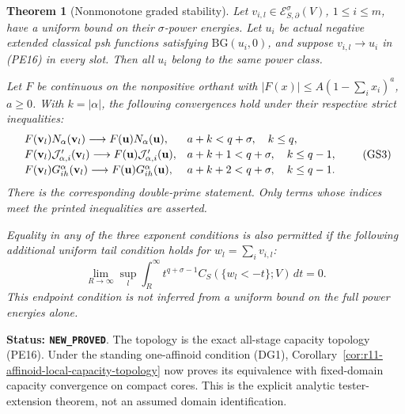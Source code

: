 \documentclass[11pt,a4paper]{article}
\numberwithin{equation}{section}
\newtheorem{theorem}{Theorem}[section]
\theoremstyle{definition}
\theoremstyle{remark}
\begin{document}
\begin{theorem}[Nonmonotone graded stability]
\label{thm:r11-nonmonotone-graded-stability}
Let $v_{i,l}\in\mathcal E^\sigma_{S,\partial}(V)$,
$1\leq i\leq m$, have a uniform bound on their
$\sigma$-power energies. Let $u_i$ be actual negative
extended classical psh functions satisfying
$\mathrm{BG}(u_i,0)$, and suppose
$v_{i,l}\to u_i$ in (PE16) in every slot.
Then all $u_i$ belong to the same power class.

Let $F$ be continuous on the nonpositive orthant with
$|F(x)|\leq A(1-\sum_i x_i)^a$, $a\geq0$.
With $k=|\alpha|$, the following convergences hold
under their respective strict inequalities:
\[
\begin{array}{ll}
 F(\mathbf v_l)N_\alpha(\mathbf v_l)
       \longrightarrow F(\mathbf u)N_\alpha(\mathbf u),
       &a+k<q+\sigma,\quad k\leq q,\\[2pt]
 F(\mathbf v_l){\cal J}'_{\alpha,i}(\mathbf v_l)
       \longrightarrow F(\mathbf u){\cal J}'_{\alpha,i}(\mathbf u),
       &a+k+1<q+\sigma,\quad k\leq q-1,\\[2pt]
 F(\mathbf v_l)G^\alpha_{ih}(\mathbf v_l)
       \longrightarrow F(\mathbf u)G^\alpha_{ih}(\mathbf u),
       &a+k+2<q+\sigma,\quad k\leq q-1.
\end{array}
 \tag{GS3}
\]
There is the corresponding double-prime statement.
Only terms whose indices meet the printed inequalities
are asserted.

Equality in any of the three exponent conditions is
also permitted if the following additional uniform
tail condition holds for $w_l=\sum_i v_{i,l}$:
\[
 \lim_{R\to\infty}\sup_l
       \int_R^\infty t^{q+\sigma-1}
              C_S(\{w_l<-t\};V)\,dt=0.
 \tag{GS4}
\]
This endpoint condition is not inferred from a
uniform bound on the full power energies alone.
\end{theorem}

\noindent\textbf{Status: \texttt{NEW\_PROVED}}.
The topology is the exact all-stage capacity topology
(PE16). Under the standing one-affinoid condition (DG1),
Corollary~\ref{cor:r11-affinoid-local-capacity-topology}
now proves its equivalence with fixed-domain capacity
convergence on compact cores. This is the explicit analytic
tester-extension theorem, not an assumed domain identification.
\end{document}
